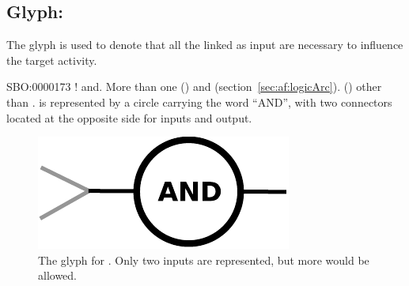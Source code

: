 \subsection{Glyph: }
\label{sec:af:and}

The glyph  is used to denote that all the  linked as input are necessary to influence the target activity.

\begin{glyphDescription}
 \glyphSboTerm SBO:0000173 ! and.
 \glyphOrigin More than one  () and  (section~\ref{sec:af:logicArc}).
 \glyphTarget  {} () other than .
 \glyphNode {} is represented by a circle carrying the word ``AND'',  with two connectors located at the opposite side for inputs and output.
\end{glyphDescription}

\begin{figure}[H]
  \centering
  \includegraphics[scale = 0.5]{images/and}
  \caption{The \AF glyph for . Only two inputs are represented, but more would be allowed.}
  \label{fig:af:and}
\end{figure}
